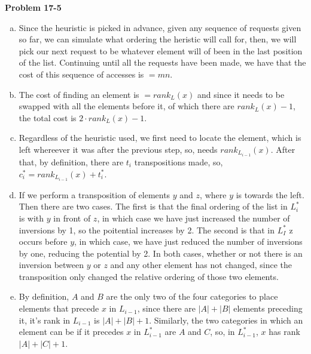 \documentclass{article}
\begin{document}
\noindent\textbf{Problem 17-5}\\
\begin{enumerate}[a.]
\item 
Since the heuristic is picked in advance, given any sequence of requests given so far, we can simulate what ordering the heristic will call for, then, we will pick our next request to be whatever element will of been in the last position of the list. Continuing until all the requests have been made, we have that the cost of this sequence of accesses is $=mn$.

\item
The cost of finding an element is $=rank_L(x)$ and since it needs to be swapped with all the elements before it, of which there are $rank_L(x)-1$, the total cost is $2\cdot rank_L(x)-1$.

\item
Regardless of the heuristic used, we first need to locate the element, which is left whereever it was after the previous step, so, needs $rank_{L_{i-1}}(x)$. After that, by definition, there are $t_i$ transpositions made, so, $c_i^* = rank_{L_{i-1}}(x) + t_i^*$.

\item
If we perform a transposition of elements $y$ and $z$, where $y$ is towards the left. Then there are two cases. The first is that the final ordering of the list in $L_i^*$ is with $y$ in front of $z$, in which case we have just increased the number of inversions by 1, so the poitential increases by 2. The second is that in $L_I^*$ z occurs before $y$, in which case, we have just reduced the number of inversions by one, reducing the potential by 2. In both cases, whether or not there is an inversion between $y$ or $z$ and any other element has not changed, since the transposition only changed the relative ordering of those two elements.

\item
By definition, $A$ and $B$ are the only two of the four categories to place elements that precede $x$ in $L_{i-1}$, since there are $|A|+|B|$ elements preceding it, it's rank in $L_{i-1}$ is $|A|+|B|+1$. Similarly, the two categories in which an element can be if it precedes $x$ in $L_{i-1}^*$ are $A$ and $C$, so, in $L_{i-1}^*$, $x$ has rank $|A|+|C|+1$.


\end{enumerate}
\end{document}
